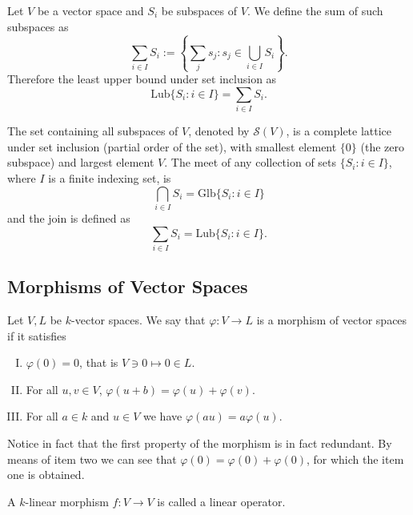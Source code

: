\begin{definition}\label{def: sum of subspaces}
   Let \(V\) be a vector space and \(S_i\) be subspaces of \(V\). We define the
   sum of such subspaces as
   \[
      \sum_{i \in I} S_i := \left\{\sum_j s_j : s_j \in \bigcup_{i \in  I}
      S_i\right\}. 
   \] 
   Therefore the least upper bound under set inclusion as 
   \[
      \mathrm{Lub}\{S_i : i \in I\} = \sum_{i \in I} S_i.
   \] 
\end{definition}

\begin{theorem}\label{thm: subspaces form a lattice}
   The set containing all subspaces of \(V\), denoted by \(\mathcal{S}(V)\), is
   a complete lattice under set inclusion (partial order of the set), with
   smallest element \(\{0\}\) (the zero subspace) and largest element \(V\). The
   meet of any collection of sets \(\{S_i : i \in I\}\), where \(I\) is a finite
   indexing set, is
   \[
      \bigcap_{i \in  I} S_i = \mathrm{Glb}\{S_i : i \in I\} 
   \] 
   and the join is defined as
   \[
      \sum_{i \in I} S_i = \mathrm{Lub}\{S_i : i \in I\}.
   \] 
\end{theorem}

\subsection{Morphisms of Vector Spaces}

\begin{definition}[Morphisms]\label{def: k-linear morphism}
   Let \(V, L\) be \(k\)-vector spaces. We say that \(\varphi : V \to L\) is a
   morphism of vector spaces if it satisfies
   \begin{enumerate}[I.]
      \item \(\varphi(0) = 0\), that is \(V \ni 0 \mapsto 0 \in L\).
      \item For all \(u, v \in V\), \(\varphi(u + b) = \varphi(u) +
         \varphi(v)\).
      \item For all \(a \in k\) and \(u \in V\) we have \(\varphi(au) =
         a\varphi(u)\).
   \end{enumerate}
\end{definition}

Notice in fact that the first property of the morphism is in fact redundant. By
means of item two we can see that \(\varphi(0) = \varphi(0) + \varphi(0)\), for
which the item one is obtained.

\begin{definition}\label{def: linear operator}
  A \(k\)-linear morphism \(f : V \to V\) is called a linear operator.
\end{definition}

